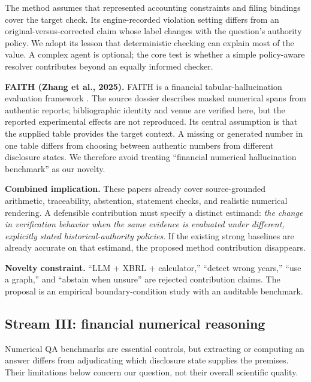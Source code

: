 \documentclass[11pt,a4paper]{article}
\newcommand{\pbreak}{\clearpage}
\newcommand{\lead}[1]{\textbf{\color{navy}#1}}
\begin{document}
The method assumes that represented accounting constraints and filing bindings cover the target check. Its engine-recorded violation setting differs from an original-versus-corrected claim whose label changes with the question's authority policy. We adopt its lesson that deterministic checking can explain most of the value. A complex agent is optional; the core test is whether a simple policy-aware resolver contributes beyond an equally informed checker.

\lead{FAITH (Zhang et al., 2025).} FAITH is a financial tabular-hallucination evaluation framework \cite{faith}. The source dossier describes masked numerical spans from authentic reports; bibliographic identity and venue are verified here, but the reported experimental effects are not reproduced. Its central assumption is that the supplied table provides the target context. A missing or generated number in one table differs from choosing between authentic numbers from different disclosure states. We therefore avoid treating “financial numerical hallucination benchmark” as our novelty.

\lead{Combined implication.} These papers already cover source-grounded arithmetic, traceability, abstention, statement checks, and realistic numerical rendering. A defensible contribution must specify a distinct estimand: \emph{the change in verification behavior when the same evidence is evaluated under different, explicitly stated historical-authority policies}. If the existing strong baselines are already accurate on that estimand, the proposed method contribution disappears.

\begin{decisionbox}
\lead{Novelty constraint.} “LLM + XBRL + calculator,” “detect wrong years,” “use a graph,” and “abstain when unsure” are rejected contribution claims. The proposal is an empirical boundary-condition study with an auditable benchmark.
\end{decisionbox}

\pbreak
\subsection{Stream III: financial numerical reasoning}
Numerical QA benchmarks are essential controls, but extracting or computing an answer differs from adjudicating which disclosure state supplies the premises. Their limitations below concern our question, not their overall scientific quality.
\end{document}
